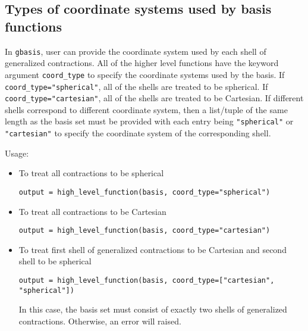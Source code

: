 \documentclass[letterpaper]{article}
\begin{document}
\subsection{Types of coordinate systems used by basis functions}
In \verb|gbasis|, user can provide the coordinate system used by each shell of
generalized contractions.
All of the higher level functions have the keyword argument \verb|coord_type| to
specify the coordinate systems used by the basis.
If \verb|coord_type="spherical"|, all of the shells are treated to be spherical.
If \verb|coord_type="cartesian"|, all of the shells are treated to be
Cartesian.
If different shells correspond to different coordinate system, then a list/tuple
of the same length as the basis set must be provided with each entry being
\verb|"spherical"| or \verb|"cartesian"| to specify the coordinate system of the
corresponding shell.

Usage:
\begin{itemize}
\item To treat all contractions to be spherical
\begin{verbatim}
output = high_level_function(basis, coord_type="spherical")
\end{verbatim}
\item To treat all contractions to be Cartesian
\begin{verbatim}
output = high_level_function(basis, coord_type="cartesian")
\end{verbatim}
\item To treat first shell of generalized contractions to be Cartesian and
  second shell to be spherical
\begin{verbatim}
output = high_level_function(basis, coord_type=["cartesian", "spherical"])
\end{verbatim}
  In this case, the basis set must consist of exactly two shells of
  generalized contractions. Otherwise, an error will raised.
\end{itemize}
\end{document}
